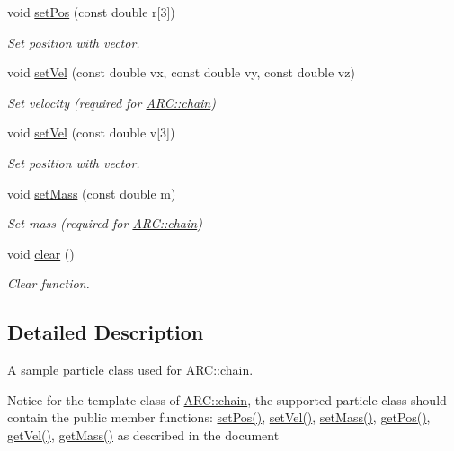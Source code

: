 \begin{DoxyCompactItemize}
void \hyperlink{classParticle_ab3c50e74691f9264d4d4d2e72a6b9536}{set\+Pos} (const double r\mbox{[}3\mbox{]})
\begin{DoxyCompactList}\small\item\em Set position with vector. \end{DoxyCompactList}\item 
void \hyperlink{classParticle_a07c405254ac3f03854e7523ff473c828}{set\+Vel} (const double vx, const double vy, const double vz)
\begin{DoxyCompactList}\small\item\em Set velocity (required for \hyperlink{classARC_1_1chain}{A\+R\+C\+::chain}) \end{DoxyCompactList}\item 
void \hyperlink{classParticle_a433720a7673f9645e4e203c32435e301}{set\+Vel} (const double v\mbox{[}3\mbox{]})
\begin{DoxyCompactList}\small\item\em Set position with vector. \end{DoxyCompactList}\item 
void \hyperlink{classParticle_a620f479862b90468a77da4e9cf5c0ff5}{set\+Mass} (const double m)
\begin{DoxyCompactList}\small\item\em Set mass (required for \hyperlink{classARC_1_1chain}{A\+R\+C\+::chain}) \end{DoxyCompactList}\item 
void \hyperlink{classParticle_ab0eea4368ee797652c528949ab4ac563}{clear} ()
\begin{DoxyCompactList}\small\item\em Clear function. \end{DoxyCompactList}\end{DoxyCompactItemize}


\subsection{Detailed Description}
A sample particle class used for \hyperlink{classARC_1_1chain}{A\+R\+C\+::chain}. 

Notice for the template class of \hyperlink{classARC_1_1chain}{A\+R\+C\+::chain}, the supported particle class should contain the public member functions\+: \hyperlink{classParticle_a97d76b66aed57834c105b78b10643b81}{set\+Pos()}, \hyperlink{classParticle_a07c405254ac3f03854e7523ff473c828}{set\+Vel()}, \hyperlink{classParticle_a620f479862b90468a77da4e9cf5c0ff5}{set\+Mass()}, \hyperlink{classParticle_abe0e7a4726615f08d4f5119c6f0fd6aa}{get\+Pos()}, \hyperlink{classParticle_af4fc2ad393343867b02534d4a75659f0}{get\+Vel()}, \hyperlink{classParticle_ad55c2cb0a6e50a48de72d6c324b00d44}{get\+Mass()} as described in the document 

